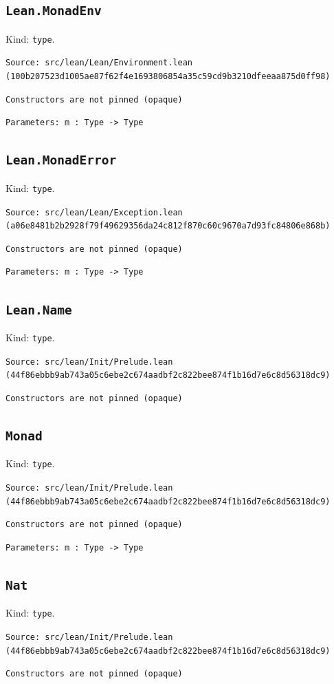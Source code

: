 \documentclass[11pt]{article}
\begin{document}
\subsection*{\texttt{Lean.MonadEnv}}
\noindent Kind: \texttt{type}.\par
\noindent \texttt{Source: src/lean/Lean/Environment.lean (100b207523d1005ae87f62f4e1693806854a35c59cd9b3210dfeeaa875d0ff98)}\par
\noindent \texttt{Constructors are not pinned (opaque)}\par
\noindent \texttt{Parameters: m : Type -> Type}\par
\subsection*{\texttt{Lean.MonadError}}
\noindent Kind: \texttt{type}.\par
\noindent \texttt{Source: src/lean/Lean/Exception.lean (a06e8481b2b2928f79f49629356da24c812f870c60c9670a7d93fc84806e868b)}\par
\noindent \texttt{Constructors are not pinned (opaque)}\par
\noindent \texttt{Parameters: m : Type -> Type}\par
\subsection*{\texttt{Lean.Name}}
\noindent Kind: \texttt{type}.\par
\noindent \texttt{Source: src/lean/Init/Prelude.lean (44f86ebbb9ab743a05c6ebe2c674aadbf2c822bee874f1b16d7e6c8d56318dc9)}\par
\noindent \texttt{Constructors are not pinned (opaque)}\par
\subsection*{\texttt{Monad}}
\noindent Kind: \texttt{type}.\par
\noindent \texttt{Source: src/lean/Init/Prelude.lean (44f86ebbb9ab743a05c6ebe2c674aadbf2c822bee874f1b16d7e6c8d56318dc9)}\par
\noindent \texttt{Constructors are not pinned (opaque)}\par
\noindent \texttt{Parameters: m : Type -> Type}\par
\subsection*{\texttt{Nat}}
\noindent Kind: \texttt{type}.\par
\noindent \texttt{Source: src/lean/Init/Prelude.lean (44f86ebbb9ab743a05c6ebe2c674aadbf2c822bee874f1b16d7e6c8d56318dc9)}\par
\noindent \texttt{Constructors are not pinned (opaque)}\par
\end{document}
